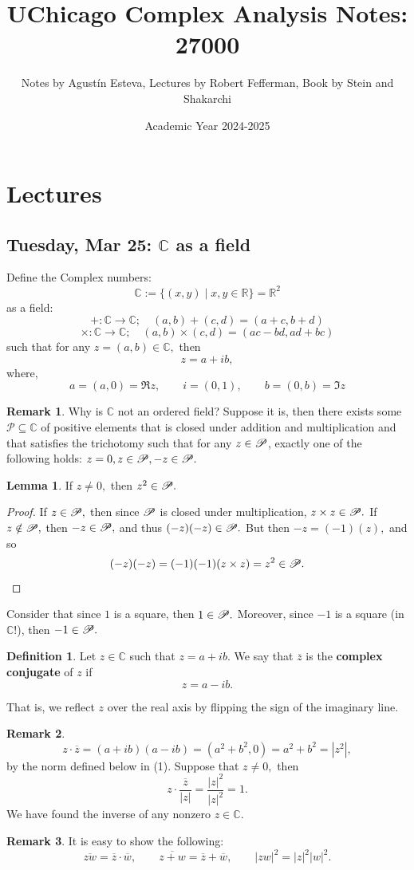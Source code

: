\documentclass[10pt, oneside]{article}
\title{UChicago Complex Analysis Notes: 27000}
\author{Notes by Agustín Esteva, Lectures by Robert Fefferman, Book by Stein and Shakarchi}
\date{Academic Year 2024-2025}
\newcommand{\bbR}{\mathbb{R}}
\newcommand{\bbC}{\mathbb{C}}
\theoremstyle{definition}
\newtheorem{defn}{Definition}
\newtheorem{rem}{Remark}
\newtheorem{lem}{Lemma}
\newcommand{\bbC}{\mathbb{C}}
\newcommand{\bbR}{\mathbb{R}}
\begin{document}
\maketitle
\tableofcontents

\vspace{.25in}


\newpage
\section{Lectures}

\subsection{Tuesday, Mar 25: $\bbC$ as a field}
Define the Complex numbers:
\[\bbC := \{(x,y) \; | \; x,y \in \bbR\} = \bbR^2\] as a field: 
\[+: \bbC \to \bbC; \quad (a,b) + (c,d) = (a + c, b + d)\]
\[\times: \bbC \to \bbC; \quad (a,b)\times (c,d) = (ac - bd, ad + bc)\] such that for any $z = (a,b) \in \bbC,$ then 
\[z = a + ib,\] where, 
\[a = (a,0) = \Re{z}, \qquad i = (0,1), \qquad b = (0,b) = \Im{z}\]

\begin{rem}
    Why is $\bbC$ not an ordered field? Suppose it is, then there exists some $\mathcal{P}\subseteq \bbC$ of positive elements that is closed under addition and multiplication and that satisfies the trichotomy such that for any $z\in \cal P$, exactly one of the following holds: $z = 0, z\in \mathcal{P}, -z\in \cal P.$ 
    \begin{lem}
        If $z \neq 0,$ then $z^2 \in \cal P.$
    \end{lem}
    \begin{proof}
        If $z\in \cal P,$ then since $\cal P$ is closed under multiplication, $z \times z \in \cal P.$
        If $z\notin \cal P,$ then $-z \in \cal P,$ and thus $(-z)(-z) \in \cal P.$ But then $-z = (-1)(z),$ and so 
        \[(-z)(-z)= (-1)(-1)(z \times z) = z^2 \in \cal P.\]
    \end{proof}
    Consider that since $1$ is a square, then $1 \in \cal P.$ Moreover, since $-1$ is a square (in $\bbC!$), then $-1 \in \cal P.$  
\end{rem}

\begin{defn}
    Let $z\in \bbC$ such that $z = a + ib.$ We say that $\overline{z}$ is the \textbf{complex conjugate} of $z$ if 
    \[ z = a - ib.\]
\end{defn}
That is, we reflect $z$ over the real axis by flipping the sign of the imaginary line. 
\begin{rem}
    \[z \cdot \overline{z} = (a + ib)(a-ib) = (a^2 + b^2, 0) = a^2 + b^2 = |z^2|,\] by the norm defined below in (1). Suppose that $z\neq 0,$ then 
    \[z \cdot \frac{\overline{z}}{|z|} = \frac{|z|^2}{|z|^2} = 1.\] We have found the inverse of any nonzero $z\in \bbC.$ 
\end{rem}
\begin{rem}
It is easy to show the following:
    \[\overline{zw} = \overline{z} \cdot \overline{w}, \qquad  \overline{z + w} = \overline{z} + \overline{w}, \qquad |zw|^2 = |z|^2|w|^2.\]
\end{rem}
\end{document}
